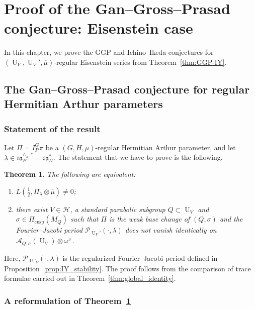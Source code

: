\documentclass[letterpaper,11pt]{amsart}
\newcommand{\fa}{\mathfrak{a}}
\newcommand{\cA}{\mathcal{A}}
\newcommand{\cH}{\mathcal{H}}
\newcommand{\cP}{\mathcal{P}}
\newcommand{\<}{\negthickspace}
\DeclareMathOperator{\U}{U}
\DeclareMathOperator{\cusp}{cusp}
\theoremstyle{definition}
\theoremstyle{plain}
\newtheorem{theorem}[definition]{Theorem}
\theoremstyle{remark}
\numberwithin{equation}{section}
\begin{document}
\section{Proof of the Gan--Gross--Prasad conjecture: Eisenstein case}

\label{sec:proof_Eisenstein}

In this chapter, we prove the GGP and Ichino--Ikeda conjectures for $(\U_V,\U_V',\overline{\mu})$-regular Eisenstein series from Theorem~\ref{thm:GGP-IY}.

\subsection{The Gan--Gross--Prasad conjecture for regular Hermitian Arthur parameters}

\label{sec:proof_GGP}

\subsubsection{Statement of the result}

Let $\Pi=I_{P}^{G} \pi$ be a $(G,H,\overline{\mu})$-regular Hermitian Arthur parameter, and let $\lambda \in i\fa_{P}^{L_\pi,*}=i\fa_\Pi^*$. The statement that we have to prove is the following.
\begin{theorem} 
    \label{thm:ggp_intro}
    The following are equivalent:
    \begin{enumerate}
    \item $L(\frac{1}{2}, \Pi_\lambda \otimes  \overline{\mu}) \not=0$; 
    \item there exist $V \in \cH$, a standard parabolic subgroup $Q \subset \U_V$ and $\sigma \in \Pi_{\cusp}(M_Q)$ such that $\Pi$ is the weak base change of $(Q,\sigma)$ and the Fourier--Jacobi period $\cP_{\U_V'}(\cdot,\lambda)$ does not vanish identically on $\cA_{Q,\sigma}(\U_V) \otimes \omega^\vee$.
    \end{enumerate}
    \end{theorem}

Here, $\cP_{\U'_V}(\cdot,\lambda)$ is the regularized Fourier--Jacobi period defined in Proposition~\ref{prop:IY_stability}. The proof follows from the comparison of trace formulae carried out in Theorem~\ref{thm:global_identity}.


\subsubsection{A reformulation of Theorem~\ref{thm:ggp_intro}}
\end{document}
